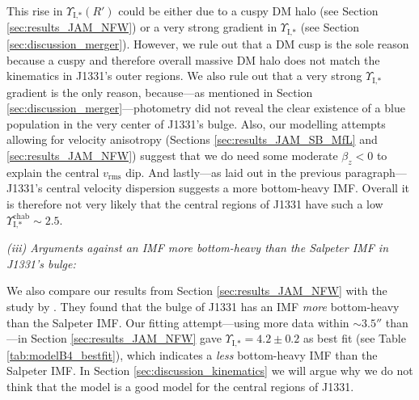 \documentclass[useAMS,usenatbib]{mnras}
\begin{document}
This rise in $\Upsilon_\text{I,*}(R')$ could be either due to a cuspy DM halo (see Section \ref{sec:results_JAM_NFW}) or a very strong gradient in $\Upsilon_\text{I,*}$ (see Section \ref{sec:discussion_merger}). However, we rule out that a DM cusp is the sole reason because a cuspy and therefore overall massive DM halo does not match the kinematics in J1331's outer regions. We also rule out that a very strong $\Upsilon_\text{I,*}$ gradient is the only reason, because---as mentioned in Section \ref{sec:discussion_merger}---photometry did not reveal the clear existence of a blue population in the very center of J1331's bulge. Also, our modelling attempts allowing for velocity anisotropy (Sections \ref{sec:results_JAM_SB_MfL} and \ref{sec:results_JAM_NFW}) suggest that we do need some moderate $\beta_z<0$ to explain the central $v_\text{rms}$ dip. And lastly---as laid out in the previous paragraph---J1331's central velocity dispersion suggests a more bottom-heavy IMF. Overall it is therefore not very likely that the central regions of J1331 have such a low $\Upsilon_\text{I,*}^\text{chab} \sim 2.5$.

\emph{(iii) Arguments against an IMF more bottom-heavy than the Salpeter IMF in J1331's bulge:}

We also compare our results from Section \ref{sec:results_JAM_NFW} with the study by \citet{SWELLSV}. They found that the bulge of J1331 has an IMF \emph{more} bottom-heavy than the Salpeter IMF. Our fitting attempt---using more data within $\sim 3.5''$ than \citet{SWELLSV}---in Section \ref{sec:results_JAM_NFW} gave $\Upsilon_\text{I,*} = 4.2 \pm 0.2$ as best fit (see Table \ref{tab:modelB4_bestfit}), which indicates a \emph{less} bottom-heavy IMF than the Salpeter IMF. In Section \ref{sec:discussion_kinematics} we will argue why we do not think that the \cite{SWELLSV} model is a good model for the central regions of J1331.
\end{document}
